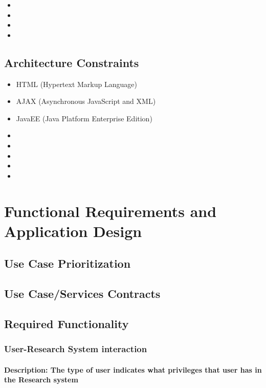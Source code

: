 \documentclass[a4paper]{article}
\begin{document}
\begin{itemize}
	\item 
	\item 
	\item 
	\item 
\end{itemize}

\subsection{Architecture Constraints}

\begin{itemize}
	\item HTML (Hypertext Markup Language)
	\item AJAX (Asynchronous JavaScript and XML)
	\item JavaEE (Java Platform Enterprise Edition)
	\item 
	\item 
	\item 
	\item 
	\item 
	
\end{itemize}

\section{Functional Requirements and Application Design}

\subsection{Use Case Prioritization}

\subsection{Use Case/Services Contracts}

\subsection{Required Functionality}
\subsubsection{User-Research System interaction}
\paragraph{\textbf{Description:} The type of user indicates what privileges that user has in the Research system}
\end{document}
